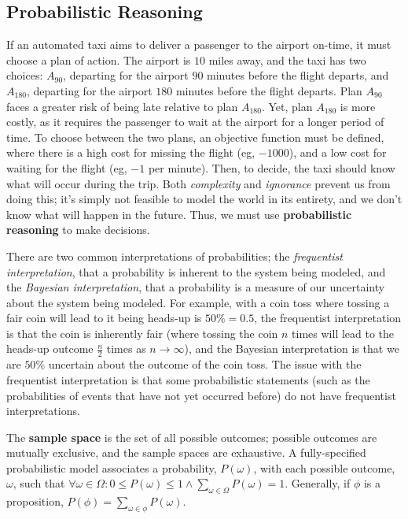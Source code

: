 
\subsection{Probabilistic Reasoning}\label{sub_sec:probabilistic_reasoning}

\begin{example}
    If an automated taxi aims to deliver a passenger to the airport on-time, it must choose a plan of action. The airport is $10$ miles away, and the taxi has two choices: $A_{90}$, departing for the airport $90$ minutes before the flight departs, and $A_{180}$, departing for the airport $180$ minutes before the flight departs. Plan $A_{90}$ faces a greater risk of being late relative to plan $A_{180}$. Yet, plan $A_{180}$ is more costly, as it requires the passenger to wait at the airport for a longer period of time. To choose between the two plans, an objective function must be defined, where there is a high cost for missing the flight (eg, $-1000$), and a low cost for waiting for the flight (eg, $-1$ per minute). Then, to decide, the taxi should know what will occur during the trip. Both \emph{complexity} and \emph{ignorance} prevent us from doing this; it's simply not feasible to model the world in its entirety, and we don't know what will happen in the future. Thus, we must use \textbf{probabilistic reasoning} to make decisions.
\end{example}

There are two common interpretations of probabilities; the \emph{frequentist interpretation}, that a probability is inherent to the system being modeled, and the \emph{Bayesian interpretation}, that a probability is a measure of our uncertainty about the system being modeled. For example, with a coin toss where tossing a fair coin will lead to it being heads-up is $50\% = 0.5$, the frequentist interpretation is that the coin is inherently fair (where tossing the coin $n$ times will lead to the heads-up outcome $\frac{n}{2}$ times as $n \rightarrow \infty$), and the Bayesian interpretation is that we are $50\%$ uncertain about the outcome of the coin toss. The issue with the frequentist interpretation is that some probabilistic statements (such as the probabilities of events that have not yet occurred before) do not have frequentist interpretations.

The \textbf{sample space} is the set of all possible outcomes; possible outcomes are mutually exclusive, and the sample spaces are exhaustive. A fully-specified probabilistic model associates a probability, $P(\omega)$, with each possible outcome, $\omega$, such that $\forall \omega \in \Omega : 0 \le P(\omega) \le 1 \land \sum_{\omega \in \Omega} P(\omega) = 1$. Generally, if $\phi$ is a proposition, $P(\phi) = \sum_{\omega \in \phi} P(\omega)$.

